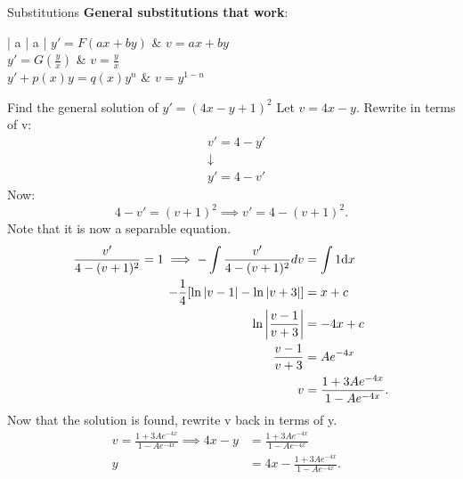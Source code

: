 \documentclass[../notes.tex]{subfiles}
\begin{document}
\begin{stickynote}{Substitutions}
				\textbf{General substitutions that work}:
				{\def\arraystretch{1.5}
				\setlength{\arrayrulewidth}{1pt}
				\begin{center}
								\begin{tabular}{| a | a |}\hline
												$y'=F(ax + by)$ & $v=ax+by$ \\\hline
								$y'=G(\frac{y}{x})$ & $v=\frac{y}{x}$ \\\hline
								$y'+p(x) y = q(x) y^{n}$ & $v=y^{1-n}$ \\\hline
				\end{tabular}
\end{center}}
\end{stickynote}

\begin{example}{Find the general solution of $y' = (4x - y + 1)^2$}
Let $v = 4x - y$. Rewrite in terms of v:
\begin{align*}
				& v' = 4 - y' \\
				& \downarrow \\
				& y' = 4 - v'
\end{align*}
Now:
\[
4-v' = (v + 1)^2 \implies v' = 4 - (v+1)^2
.\]
Note that it is now a separable equation.
\begin{align*}
				\frac{v'}{4-(v+1)^2} = 1 \implies -\int\frac{v'}{4-(v+1)^2} dv &= \int 1 \dd x \\
				-\frac{1}{4} \qty[\ln{\abs{ v-1 }} - \ln{\abs{ v+3 }}] &= x+c \\
				\ln{\abs{ \frac{v-1}{v+3} } } &= -4x + c \\
				\frac{v-1}{v+3} &= Ae^{-4x} \\
				v &= \frac{1+3Ae^{-4x}}{1-Ae^{-4x}}
.\end{align*}
Now that the solution is found, rewrite v back in terms of y.
\begin{align*}
				v = \frac{1+3Ae^{-4x}}{1-Ae^{-4x}} \implies 4x-y &= \frac{1+3Ae^{-4x}}{1-Ae^{-4x}} &\\
				y &= 4x - \frac{1+3Ae^{-4x}}{1-Ae^{-4x}}
.\end{align*}
\end{example}
\end{document}
